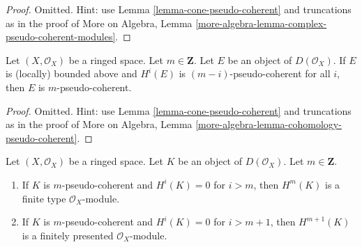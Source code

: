 \begin{proof}
Omitted. Hint: use Lemma \ref{lemma-cone-pseudo-coherent} and truncations
as in the proof of
More on Algebra, Lemma \ref{more-algebra-lemma-complex-pseudo-coherent-modules}.
\end{proof}

\begin{lemma}
\label{lemma-cohomology-pseudo-coherent}
Let $(X, \mathcal{O}_X)$ be a ringed space. Let $m \in \mathbf{Z}$. Let
$E$ be an object of $D(\mathcal{O}_X)$. If $E$ is (locally) bounded above
and $H^i(E)$ is $(m - i)$-pseudo-coherent for all $i$, then
$E$ is $m$-pseudo-coherent.
\end{lemma}

\begin{proof}
Omitted. Hint: use Lemma \ref{lemma-cone-pseudo-coherent} and truncations
as in the proof of
More on Algebra, Lemma \ref{more-algebra-lemma-cohomology-pseudo-coherent}.
\end{proof}

\begin{lemma}
\label{lemma-finite-cohomology}
Let $(X, \mathcal{O}_X)$ be a ringed space.
Let $K$ be an object of $D(\mathcal{O}_X)$.
Let $m \in \mathbf{Z}$.
\begin{enumerate}
\item If $K$ is $m$-pseudo-coherent and $H^i(K) = 0$
for $i > m$, then $H^m(K)$ is a finite type $\mathcal{O}_X$-module.
\item If $K$ is $m$-pseudo-coherent and $H^i(K) = 0$
for $i > m + 1$, then $H^{m + 1}(K)$ is a finitely presented
$\mathcal{O}_X$-module.
\end{enumerate}
\end{lemma}

